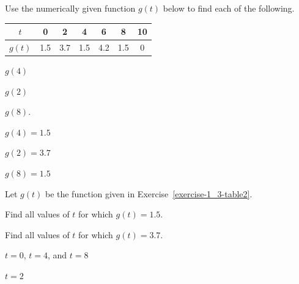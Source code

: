 



\begin{exercise}
\label{exercise-1_3-table2}
Use the numerically given function $g(t)$ below to find each of the following.

\begin{center}
\begin{tabular}{|c|c|c|c|c|c|c|}
\hline $t$ & 0 & 2 & 4 & 6 & 8 & 10 
\\\hline $g(t)$ & 1.5 & 3.7 & 1.5 & 4.2 & 1.5 & 0
\\\hline
\end{tabular}
\end{center}

\begin{parts}
\item $g(4)$
\item $g(2)$
\item $g(8)$. 
\end{parts}
\end{exercise}


\begin{solution}
    \begin{parts}
        \item $g(4)=1.5$
        \item $g(2)=3.7$
        \item $g(8)=1.5$
    \end{parts}
\end{solution}






\begin{exercise}
Let $g(t)$ be the function given in Exercise~\ref{exercise-1_3-table2}.

\begin{parts}
\item Find all values of $t$ for which $g(t)=1.5$.

\item Find all values of $t$ for which $g(t)=3.7$.
\end{parts}
\end{exercise}


\begin{solution}
\begin{parts}
    \item $t=0$, $t=4$, and $t=8$
    \item $t=2$
\end{parts}
\end{solution}



